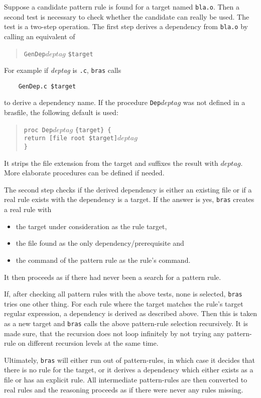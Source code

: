 \documentclass[12pt]{article}
\newcommand{\bras}{\texttt{bras}}
\begin{document}
Suppose a candidate pattern rule is found for a target named
\texttt{bla.o}. Then a second test is necessary to check whether the
candidate can really be used. The test is a two-step operation.  The
first step derives a dependency from \texttt{bla.o} by calling an
equivalent of
\begin{quote}
    \texttt{GenDep}$deptag$ \texttt{\$target}
\end{quote}
For example if \textit{deptag} is \texttt{.c}, \bras{} calls
\begin{verbatim}
    GenDep.c $target
\end{verbatim}
to derive a dependency name. If the procedure \texttt{Dep$deptag$}
was not defined in a brasfile, the following
default is used:
\begin{quote}
  \verb|proc Dep|$deptag$ \verb|{target} {|\\
    \texttt{\hspace*{2em}return [file root \$target]$deptag$}\\
    \verb|}|
\end{quote}
It strips the file extension from the target and suffixes the
result with $deptag$. More elaborate procedures can be defined if needed.

The second step checks if 
the derived dependency is either an existing file or if a real rule
exists with the dependency is a target.
If the answer is yes, \bras{} creates a real rule with
\begin{itemize}
\item the target under consideration as the rule target,
\item the file found as the only dependency/prerequisite and
\item the command of the pattern rule as the rule's command.
\end{itemize}
It then proceeds as if there had never been a search for a pattern
rule.

If, after checking all pattern rules with the above tests, none is
selected, \bras{} tries one other thing. For each rule where the
target matches the rule's target regular expression, a dependency is
derived as described above. Then this is taken as a new target and
\bras{} calls the above pattern-rule selection recursively. It is made
sure, that the recursion does not loop infinitely by not trying any
pattern-rule on different recursion levels at the same time.

Ultimately, \bras{} will either run out of pattern-rules, in which
case it decides that there is no rule for the target, or it derives a
dependency which either exists as a file or has an explicit rule. All
intermediate pattern-rules are then converted to real rules and the
reasoning proceeds as if there were never any rules missing.
\end{document}
